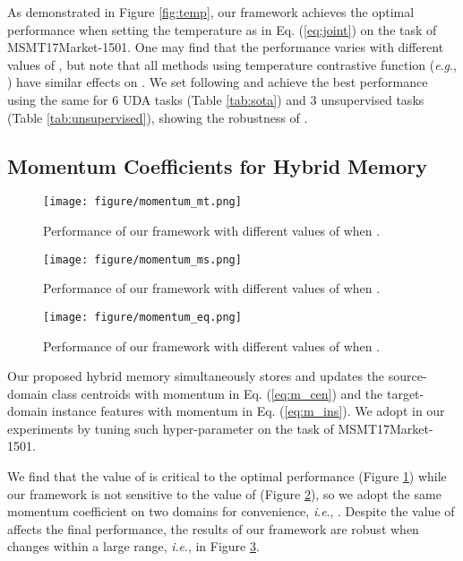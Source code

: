 \documentclass{article}
\newcommand{\ie}{\textit{i}.\textit{e}., }
\newcommand{\eg}{\textit{e}.\textit{g}., }
\begin{document}
As demonstrated in Figure \ref{fig:temp},
our framework achieves the optimal performance when setting the temperature  as  in Eq. (\ref{eq:joint}) on the task of MSMT17Market-1501.
One may find that the performance varies with different values of ,
but note that all methods using temperature contrastive function (\eg \cite{zhong2019invariance,zhong2020learning,wu2018unsupervised,he2019momentum,chen2020simple,oord2018representation}) have similar effects on .
We set  following \cite{zhong2019invariance,zhong2020learning} and achieve the best performance using the same  for 6 UDA tasks (Table \ref{tab:sota}) and 3 unsupervised tasks (Table \ref{tab:unsupervised}), showing the robustness of .

\subsection{Momentum Coefficients  for Hybrid Memory}


\begin{figure}[H]
\centering
\texttt{[image: figure/momentum\_mt.png]}
\caption{Performance of our framework with different values of  when .}
\label{fig:mom_mt}
\end{figure}

\begin{figure}[H]
\centering
\texttt{[image: figure/momentum\_ms.png]}
\caption{Performance of our framework with different values of  when .}
\label{fig:mom_ms}
\end{figure}

\begin{figure}[H]
\centering
\texttt{[image: figure/momentum\_eq.png]}
\caption{Performance of our framework with different values of  when .}
\label{fig:mom_eq}
\end{figure}

Our proposed hybrid memory simultaneously stores and updates the source-domain class centroids with momentum  in Eq. (\ref{eq:m_cen}) and the target-domain instance features with momentum  in Eq. (\ref{eq:m_ins}).
We adopt  in our experiments by tuning such hyper-parameter on the task of MSMT17Market-1501.

We find that the value of  is critical to the optimal performance (Figure \ref{fig:mom_mt}) while 
our framework is not sensitive to the value of  (Figure \ref{fig:mom_ms}),
so we adopt the same momentum coefficient on two domains for convenience, \ie .
Despite the value of  affects the final performance,
the results of our framework are robust when  changes within a large range, \ie  in Figure \ref{fig:mom_eq}.
\end{document}
